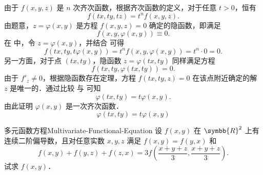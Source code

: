 \begin{myproof}
    由于 $f(x, y, z)$ 是 $n$ 次齐次函数，根据齐次函数的定义，对于任意 $t > 0$，恒有
    \begin{equation}
        f(tx, ty, tz) = t^n f(x, y, z). \label{eq:homo-def}
    \end{equation}
    由题意，$z = \varphi(x, y)$ 是方程 $f(x, y, z) = 0$ 确定的隐函数，即满足
    \begin{equation}
        f(x, y, \varphi(x, y)) \equiv 0. \label{eq:implicit-relation}
    \end{equation}
    在  中，令 $z = \varphi(x, y)$，并结合  可得
    \begin{equation}
        f(tx, ty, t\varphi(x, y)) = t^n f(x, y, \varphi(x, y)) = t^n \cdot 0 = 0. \label{eq:scaled-zero}
    \end{equation}
    另一方面，对于点 $(tx, ty)$，隐函数 $z = \varphi(tx, ty)$ 同样满足方程
    \begin{equation}
        f(tx, ty, \varphi(tx, ty)) = 0. \label{eq:scaled-implicit}
    \end{equation}
    由于 $f'_z \neq 0$，根据隐函数存在定理，方程 $f(tx, ty, z) = 0$ 在该点附近确定的解 $z$ 是唯一的．通过比较  与  可知
    \begin{equation}
        \varphi(tx, ty) = t\varphi(x, y).
    \end{equation}
    由此证明 $\varphi(x, y)$ 是一次齐次函数．
    \begin{equation}
        \boxed{\varphi(tx, ty) = t\varphi(x, y)}
    \end{equation}
\end{myproof}



\begin{problem}{多元函数方程}{Multivariate-Functional-Equation}
    设 $f(x,y)$ 在 $\symbb{R}^2$ 上有连续二阶偏导数，且对任意实数 $x,y,z$ 满足 $f(x,y)=f(y,x)$ 和
    \begin{equation}
        f(x,y) + f(y,z) + f(z,x) = 3f\left(\frac{x+y+z}{3}, \frac{x+y+z}{3}\right).
    \end{equation}
    试求 $f(x,y)$．
\end{problem}

